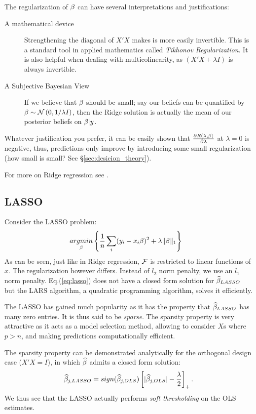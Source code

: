 The regularization of $\beta$ can have several interpretations and justifications:
\begin{description}
\item[A mathematical device] Strengthening the diagonal of $X'X$ makes is more easily invertible. This is a standard tool in applied mathematics called \emph{Tikhonov Regularization}. It is also helpful when dealing with multicolinearity, as $(X'X+\lambda I)$ is always invertible.
\item[A Subjective Bayesian View] If we believe that $\beta$ should be small; say our beliefs can be quantified by $\mathbf{\beta} \sim \mathcal{N}\left(0,1/\lambda I\right)$, then the Ridge solution is actually the mean of our posterior beliefs on $\mathbf{\beta}|y$.
\end{description}

Whatever justification you prefer, it can be easily shown that $\frac{\partial R(\lambda,\beta)}{\partial \lambda}$ at $\lambda=0$ is negative, thus, predictions only improve by introducing some small regularization (how small is small? See \S\ref{sec:desicion_theory}).

For more on Ridge regression see \cite{hastie_elements_2003}.


\subsection{LASSO}
\label{sec:lasso}

Consider the LASSO problem:
\begin{align}
\label{eq:lasso}
	& \mathop{argmin} _{\beta}\left\{ \frac{1}{n}\sum_i (y_i-x_i\beta)^2 + \lambda \Vert \beta \Vert_1 \right\} 
\end{align}
As can be seen, just like in Ridge regression, $\mathcal{F}$ is restricted to linear functions of $x$. The regularization however differs. Instead of $l_2$ norm penalty, we use an $l_1$ norm penalty.
Eq.(\ref{eq:lasso}) does not have a closed form solution for $\widehat{\beta}_{LASSO}$ but the LARS algorithm, a quadratic programming algorithm, solves it efficiently.



The LASSO has gained much popularity as it has the property that $\widehat{\beta}_{LASSO}$ has many zero entries. It is thus said to be \emph{sparse}.
The sparsity property is very attractive as it acts as a model selection method, allowing to consider $X$s where $p>n$, and making predictions computationally efficient.

The sparsity property can be demonstrated analytically for the orthogonal design case ($X'X=I$), in which $\widehat{\beta}$ admits a closed form solution:
\begin{align}
	\widehat{\beta}_{j,LASSO} = sign(\widehat{\beta}_{j,OLS}) \left[|\widehat{\beta}_{j,OLS}|-\frac{\lambda}{2} \right]_+.
\end{align}
We thus see that the LASSO actually performs \emph{soft thresholding} on the OLS estimates. 




